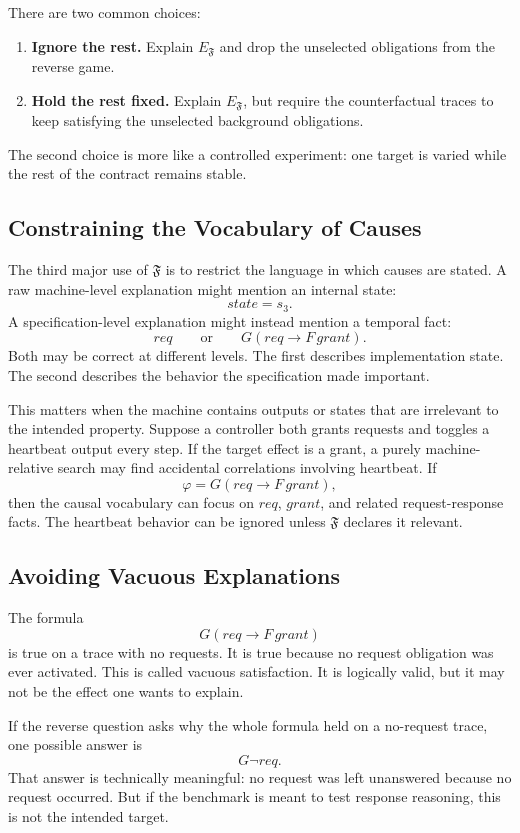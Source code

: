 \documentclass[11pt]{article}
\theoremstyle{remark}
\newcommand{\Frame}{\mathfrak{F}}
\begin{document}
There are two common choices:
\begin{enumerate}[label=\arabic*.]
  \item \textbf{Ignore the rest.} Explain \(E_{\Frame}\) and drop the unselected
        obligations from the reverse game.
  \item \textbf{Hold the rest fixed.} Explain \(E_{\Frame}\), but require the
        counterfactual traces to keep satisfying the unselected background
        obligations.
\end{enumerate}
The second choice is more like a controlled experiment: one target is varied
while the rest of the contract remains stable.

\subsection{Constraining the Vocabulary of Causes}

The third major use of \(\Frame\) is to restrict the language in which causes
are stated. A raw machine-level explanation might mention an internal state:
\[
  state=s_3.
\]
A specification-level explanation might instead mention a temporal fact:
\[
  req
  \qquad\text{or}\qquad
  G(req\rightarrow F\,grant).
\]
Both may be correct at different levels. The first describes implementation
state. The second describes the behavior the specification made important.

This matters when the machine contains outputs or states that are irrelevant to
the intended property. Suppose a controller both grants requests and toggles a
heartbeat output every step. If the target effect is a grant, a purely
machine-relative search may find accidental correlations involving heartbeat.
If
\[
  \varphi = G(req\rightarrow F\,grant),
\]
then the causal vocabulary can focus on \(req\), \(grant\), and related
request-response facts. The heartbeat behavior can be ignored unless
\(\Frame\) declares it relevant.

\subsection{Avoiding Vacuous Explanations}

The formula
\[
  G(req\rightarrow F\,grant)
\]
is true on a trace with no requests. It is true because no request obligation
was ever activated. This is called vacuous satisfaction. It is logically valid,
but it may not be the effect one wants to explain.

If the reverse question asks why the whole formula held on a no-request trace,
one possible answer is
\[
  G\neg req.
\]
That answer is technically meaningful: no request was left unanswered because
no request occurred. But if the benchmark is meant to test response reasoning,
this is not the intended target.
\end{document}
